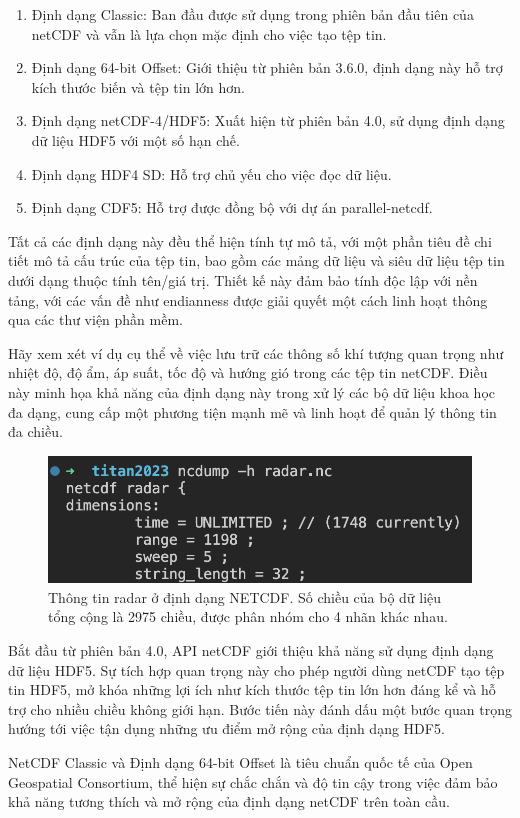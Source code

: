 \begin{enumerate}
    \item Định dạng Classic: Ban đầu được sử dụng trong phiên bản đầu tiên của netCDF và vẫn là lựa chọn mặc định cho việc tạo tệp tin.
    \item Định dạng 64-bit Offset: Giới thiệu từ phiên bản 3.6.0, định dạng này hỗ trợ kích thước biến và tệp tin lớn hơn.
    \item Định dạng netCDF-4/HDF5: Xuất hiện từ phiên bản 4.0, sử dụng định dạng dữ liệu HDF5 với một số hạn chế.
    \item Định dạng HDF4 SD: Hỗ trợ chủ yếu cho việc đọc dữ liệu.
    \item Định dạng CDF5: Hỗ trợ được đồng bộ với dự án parallel-netcdf.
\end{enumerate}

Tất cả các định dạng này đều thể hiện tính tự mô tả, với một phần tiêu đề chi tiết mô tả cấu trúc của tệp tin, bao gồm các mảng dữ liệu và siêu dữ liệu tệp tin dưới dạng thuộc tính tên/giá trị. Thiết kế này đảm bảo tính độc lập với nền tảng, với các vấn đề như endianness được giải quyết một cách linh hoạt thông qua các thư viện phần mềm.

Hãy xem xét ví dụ cụ thể về việc lưu trữ các thông số khí tượng quan trọng như nhiệt độ, độ ẩm, áp suất, tốc độ và hướng gió trong các tệp tin netCDF. Điều này minh họa khả năng của định dạng này trong xử lý các bộ dữ liệu khoa học đa dạng, cung cấp một phương tiện mạnh mẽ và linh hoạt để quản lý thông tin đa chiều.

\begin{figure}[H]
    \centering
    \includegraphics[width=1\linewidth]{Images/ncdump.png}
    \vspace{1em}
    \caption{Thông tin radar ở định dạng NETCDF. Số chiều của bộ dữ liệu tổng cộng là 2975 chiều, được phân nhóm cho 4 nhãn khác nhau.}
    \label{fig:enter-label}
\end{figure}


Bắt đầu từ phiên bản 4.0, API netCDF giới thiệu khả năng sử dụng định dạng dữ liệu HDF5. Sự tích hợp quan trọng này cho phép người dùng netCDF tạo tệp tin HDF5, mở khóa những lợi ích như kích thước tệp tin lớn hơn đáng kể và hỗ trợ cho nhiều chiều không giới hạn. Bước tiến này đánh dấu một bước quan trọng hướng tới việc tận dụng những ưu điểm mở rộng của định dạng HDF5.

NetCDF Classic và Định dạng 64-bit Offset là tiêu chuẩn quốc tế của Open Geospatial Consortium\cite{ogcnetcdf}, thể hiện sự chắc chắn và độ tin cậy trong việc đảm bảo khả năng tương thích và mở rộng của định dạng netCDF trên toàn cầu.